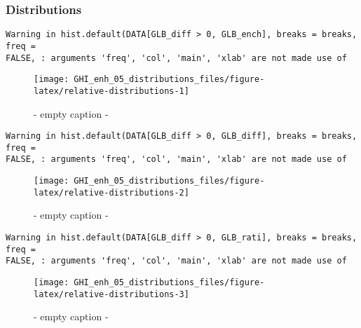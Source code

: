 \documentclass[
  10pt,
  a4paper,oneside]{article}
\begin{document}
\FloatBarrier

\hypertarget{distributions}{%
\subsubsection{Distributions}\label{distributions}}

\begin{verbatim}
Warning in hist.default(DATA[GLB_diff > 0, GLB_ench], breaks = breaks, freq =
FALSE, : arguments 'freq', 'col', 'main', 'xlab' are not made use of
\end{verbatim}

\begin{figure}[H]

{\centering \texttt{[image: GHI\_enh\_05\_distributions\_files/figure-latex/relative-distributions-1]} 

}

\caption{ - empty caption - }\label{fig:relative-distributions-1}
\end{figure}

\begin{verbatim}
Warning in hist.default(DATA[GLB_diff > 0, GLB_diff], breaks = breaks, freq =
FALSE, : arguments 'freq', 'col', 'main', 'xlab' are not made use of
\end{verbatim}

\begin{figure}[H]

{\centering \texttt{[image: GHI\_enh\_05\_distributions\_files/figure-latex/relative-distributions-2]} 

}

\caption{ - empty caption - }\label{fig:relative-distributions-2}
\end{figure}

\begin{verbatim}
Warning in hist.default(DATA[GLB_diff > 0, GLB_rati], breaks = breaks, freq =
FALSE, : arguments 'freq', 'col', 'main', 'xlab' are not made use of
\end{verbatim}

\begin{figure}[H]

{\centering \texttt{[image: GHI\_enh\_05\_distributions\_files/figure-latex/relative-distributions-3]} 

}

\caption{ - empty caption - }\label{fig:relative-distributions-3}
\end{figure}
\end{document}
